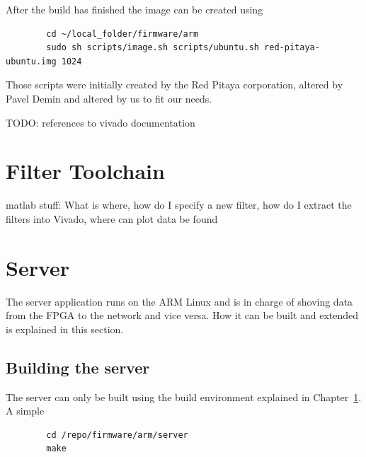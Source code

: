 After the build has finished the image can be created using

\begin{listing}
    \begin{verbatim}
        cd ~/local_folder/firmware/arm
        sudo sh scripts/image.sh scripts/ubuntu.sh red-pitaya-ubuntu.img 1024
    \end{verbatim}
\end{listing}

Those scripts were initially created by the Red Pitaya corporation, altered by Pavel Demin\cite{TODO:} and altered by us to fit our needs.

TODO: references to vivado documentation

\chapter{Filter Toolchain} %
\label{ch:devguide:fpga_toolchain}
matlab stuff: What is where,  how do I specify a new filter,  how do I extract
the filters into Vivado, where can plot data be found

\chapter{Server} %
\label{ch:devguide:server}

The server application runs on the ARM Linux and is in charge of shoving data from the FPGA to the network and vice versa.
How it can be built and extended is explained in this section.

\section{Building the server}
\label{sec:devguide:server:build}

The server can only be built using the build environment explained in Chapter~\ref{ch:devguide:fpga_toolchain}.
A simple

\begin{listing}
    \begin{verbatim}
        cd /repo/firmware/arm/server
        make
    \end{verbatim}
\end{listing}

